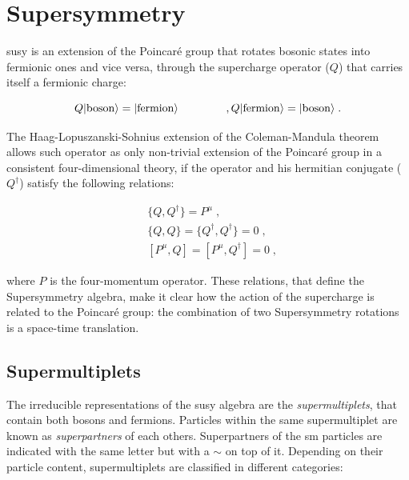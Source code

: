 \section{Supersymmetry}
\label{sec:smsusy:susy}

\gls{susy} \cite{Wess:1974tw, Salam:1974ig} is an extension of the Poincar\'e group that rotates bosonic states into fermionic ones and vice versa, through the supercharge operator ($Q$) that carries itself a fermionic charge: 

\begin{equation}
Q |{\rm boson}\rangle = |{\rm fermion }\rangle \qquad\qquad \;,
Q |{\rm fermion}\rangle = |{\rm boson }\rangle \; .
\end{equation}

\noindent The Haag-Lopuszanski-Sohnius extension of the Coleman-Mandula theorem \cite{HAAG1975257} allows such operator as only non-trivial extension of the Poincar\'e group in a consistent four-dimensional theory, if the operator and his hermitian conjugate ($Q^\dagger$) satisfy the following relations:

\begin{equation}
\begin{aligned}
&\{ Q, Q^\dagger \} = P^\mu \; ,  \\
&\{ Q,Q \} = \{ Q^\dagger , Q^\dagger \} = 0  \;,  \\
&[ P^\mu , Q  ] = [P^\mu, Q^\dagger ] = 0 \; ,
\label{eq:susyalgth}
\end{aligned}
\end{equation}

\noindent where $P$ is the four-momentum operator. These relations, that define the Supersymmetry algebra, make it clear how the action of the supercharge is related to the Poincar\'e group: the combination of two Supersymmetry rotations is a space-time translation.

\subsection{Supermultiplets}

The irreducible representations of the \gls{susy} algebra are the \textit{supermultiplets}, that contain both bosons and fermions. Particles within the same supermultiplet are known as \textit{superpartners} of each others. Superpartners of the \gls{sm} particles are indicated with the same letter but with a $\sim$ on top of it. Depending on their particle content, supermultiplets are classified in different categories:

